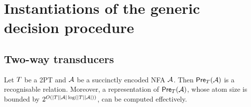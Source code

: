 
\section{Instantiations of the generic decision procedure}
 
\subsection{Two-way transducers}\label{sec-2way}



\begin{lemma}\label{lem-2pt}
Let $T$ be a 2PT and $\mathcal{A}$ be a succinctly encoded NFA $\mathcal{A}$. Then $\textsf{Pre}_{T}(\mathcal{A})$ is a recognisable relation. Moreover, a representation of $\textsf{Pre}_{T}(\mathcal{A})$, whose atom size is bounded by $2^{O(|T||\mathcal{A}|\log (|T||\mathcal{A}|))}$, can be computed effectively.
\end{lemma}

